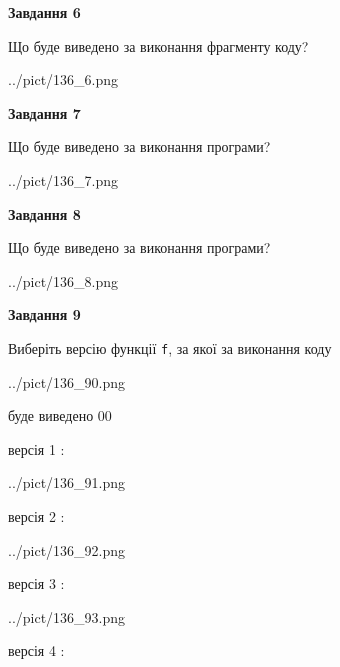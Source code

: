 \documentclass[12pt, ukrainian]{article}
\def\code#1{\Verb!#1!}
\begin{document}
{\begin {large}
{\begin {center}\textbf{Завдання 6}\end {center}}

Що буде виведено за виконання фрагменту коду?\par
\begin{center}
	{../pict/136_6.png}
\end{center}
\newpage

{\begin {center}\textbf{Завдання 7}\end {center}}

Що буде виведено за виконання програми?\par
\begin{center}
	{../pict/136_7.png}
\end{center}
\newpage

{\begin {center}\textbf{Завдання 8}\end {center}}

Що буде виведено за виконання програми?\par
\begin{center}
	{../pict/136_8.png}
\end{center}
\newpage

{\begin {center}\textbf{Завдання 9}\end {center}}

Виберіть версію функції \code{f}, за якої за виконання коду
\begin{center}
	{../pict/136_90.png}
\end{center}
буде виведено 00

\vspace{5mm}
версія 1 :

\begin{center}
	{../pict/136_91.png}
\end{center}
версія 2 :

\begin{center}
	{../pict/136_92.png}
\end{center}
версія 3 :

\begin{center}
	{../pict/136_93.png}
\end{center}
версія 4 :


\end{large}}
\end{document}

